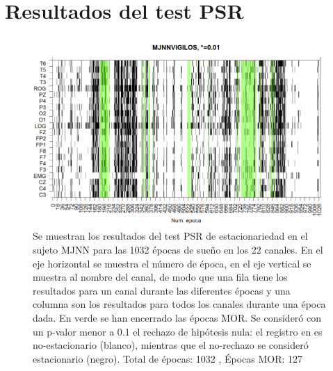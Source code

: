 
\chapter{Resultados del test PSR}



\begin{figure}
\includegraphics[width=\textwidth]{est01.png} 
\caption{Se muestran los resultados del test PSR de estacionariedad en el sujeto MJNN para las 1032 épocas de sueño en los
22 canales. En el eje horizontal se muestra el número de época, en el eje vertical se muestra al nombre del canal, de
modo que una fila tiene los resultados para un canal durante las diferentes épocas y una columna son los resultados
para todos los canales durante una época dada. En verde se han encerrado las épocas MOR.
Se consideró con un p-valor menor a 0.1 el rechazo de hipótesis nula: el registro en es no-estacionario (blanco),
mientras que el no-rechazo se consideró estacionario (negro).
Total de épocas: 1032 , Épocas MOR: 127}
\end{figure}

